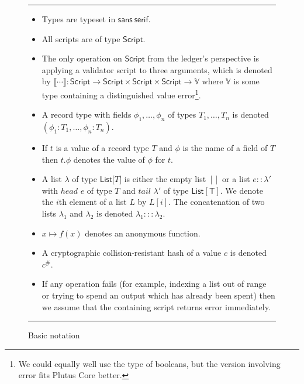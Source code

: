\documentclass[a4paper]{article}
\theoremstyle{definition}  %
\newcommand\rfskip{7pt}
\newenvironment{ruledfigure}[1]{\begin{figure}[#1]\hrule\vspace{\rfskip}}{\vspace{\rfskip}\hrule\end{figure}}
\begin{document}
\begin{ruledfigure}{H}
\begin{itemize}
\item Types are typeset in $\mathsf{sans~serif}$.

\item All scripts are of type $\mathsf{Script}$.

\item The only operation on $\mathsf{Script}$ from the ledger's
  perspective is applying a validator script to three arguments,
  which is denoted by $\llbracket \cdots \rrbracket :
  \mathsf{Script} \rightarrow \mathsf{Script} \times \mathsf{Script}
    \times \mathsf{Script} \rightarrow \mathbb{V}$ where $\mathbb{V}$
    is some type containing a distinguished value
    \textsf{error}\footnote{We could equally well use the type of
      booleans, but the version involving \textsf{error} fits Plutus
      Core better.}.

\item A record type with fields $\phi_1, \ldots, \phi_n$ of types $T_1,
  \ldots, T_n$ is denoted $(\phi_1 : T_1, \ldots, \phi_n : T_n)$.

\item If $t$ is a value of a record type $T$ and $\phi$ is the name
  of a field of $T$ then $t.\phi$ denotes the value of $\phi$ for
  $t$.
  
\item A list $\lambda$ of type $\mathsf{List[}T\mathsf{]}$ is
    either the empty list $[]$ or a list $e :: \lambda'$ with $head$
    $e$ of type $T$ and $tail$ $\lambda'$ of type
    $\mathsf{List[T]}$. We denote the $i$th element of a list
    $L$ by $L[i]$.
    The concatenation of two lists $\lambda_1$ and
    $\lambda_2$ is denoted $\lambda_1 ::: \lambda_2$.

  \item $x \mapsto f(x)$ denotes an anonymous function.

  \item A cryptographic
    collision-resistant hash of a value $c$ is denoted $c^{\#}$.

  \item If any operation fails (for example, indexing a list out of
    range or trying to spend an output which has already been spent)
    then we assume that the containing script returns \textsf{error}
    immediately.
\end{itemize}
\caption{Basic notation}
\label{fig:basic-notation}
\end{ruledfigure}
\end{document}
